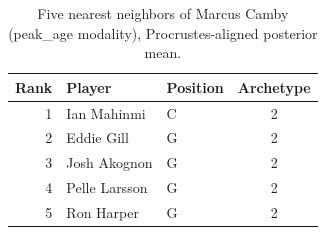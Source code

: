 \begin{table}[htbp]
  \centering\small
  \begin{tabular}{rllc}
    \toprule
    Rank & Player & Position & Archetype \\
    \midrule
    1 & Ian Mahinmi & C & 2 \\
    2 & Eddie Gill & G & 2 \\
    3 & Josh Akognon & G & 2 \\
    4 & Pelle Larsson & G & 2 \\
    5 & Ron Harper & G & 2 \\
    \bottomrule
  \end{tabular}
  \caption{Five nearest neighbors of Marcus Camby (peak_age modality), Procrustes-aligned posterior mean.}
  \label{tab:Marcus_Camby_neighbors_peak_age}
\end{table}

